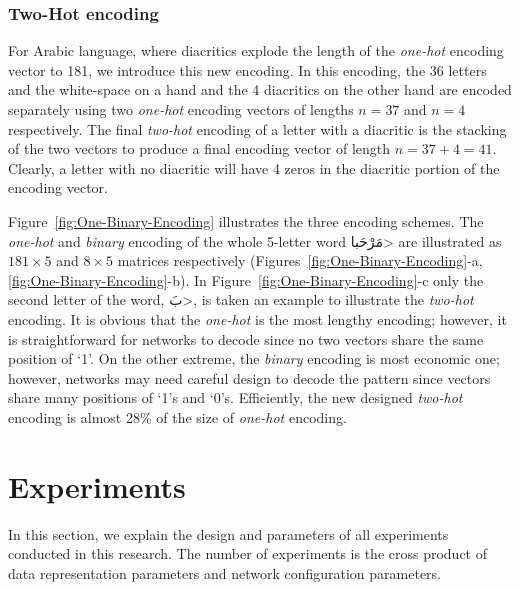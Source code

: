 \documentclass[journal,10pt,twocolumns,letter]{IEEEtran}
\begin{document}
\subsubsection{Two-Hot encoding}\label{sec:two-hot-encoding}
For Arabic language, where diacritics explode the length of the \textit{one-hot} encoding vector to
181, we introduce this new encoding. In this encoding, the 36 letters and the white-space on a hand
and the 4 diacritics on the other hand are encoded separately using two \textit{one-hot} encoding
vectors of lengths $n=37$ and $n=4$ respectively. The final \textit{two-hot} encoding of a
letter with a diacritic is the stacking of the two vectors to produce a final encoding vector of
length $n=37+4 = 41$. Clearly, a letter with no diacritic will have 4 zeros in the diacritic portion
of the encoding vector.

Figure~\ref{fig:One-Binary-Encoding} illustrates the three encoding schemes. The \textit{one-hot}
and \textit{binary} encoding of the whole 5-letter word \<مَرْحَبا> are illustrated as
$181 \times 5$ and $8 \times 5$ matrices respectively (Figures~\ref{fig:One-Binary-Encoding}-a,
\ref{fig:One-Binary-Encoding}-b). In Figure~\ref{fig:One-Binary-Encoding}-c only the second letter
of the word, \<بَ>, is taken an example to illustrate the \textit{two-hot} encoding. It is
obvious that the \textit{one-hot} is the most lengthy encoding; however, it is straightforward for
networks to decode since no two vectors share the same position of `1'. On the other extreme, the
\textit{binary} encoding is most economic one; however, networks may need careful design to decode
the pattern since vectors share many positions of `1's and `0's. Efficiently, the new designed
\textit{two-hot} encoding is almost 28\% of the size of \textit{one-hot} encoding.








\section{Experiments}\label{sec:model}
In this section, we explain the design and parameters of all experiments conducted in this
research. The number of experiments is the cross product of data representation parameters and
network configuration parameters.
\end{document}
